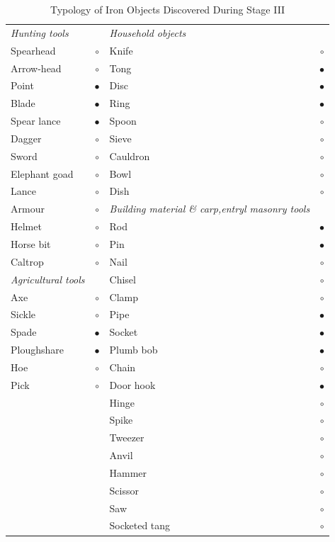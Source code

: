 {\newpage

{\fontsize{8}{10}\selectfont
\begin{longtable}{|l|c|p{3cm}|c|}
\captionsetup{font=footnotesize}
\caption{Typology of Iron Objects Discovered During Stage III}\label{table IV.10}\\
\hline
{\it Hunting tools}  & & {\it Household objects} & \\
Spearhead & $\circ$ & Knife &$\circ$\\
Arrow-head & $\circ$& Tong &$\bullet$\\
Point& $\bullet$ & Disc &$\bullet$\\
Blade & $\bullet$ & Ring & $\bullet$\\
Spear lance & $\bullet$ & Spoon &$\circ$\\
Dagger & $\circ$ & Sieve & $\circ$ \\
Sword & $\circ$ & Cauldron &$\circ$\\
Elephant goad & $\circ$ & Bowl & $\circ$\\
Lance & $\circ$ & Dish & $\circ$\\
Armour & $\circ$ & {\it Building material \& carp,entryl masonry tools} & \\
Helmet & $\circ$ & Rod & $\bullet$\\
Horse bit & $\circ$ & Pin & $\bullet$\\
Caltrop & $\circ$ & Nail & $\circ$\\
{\it Agricultural tools} & &  Chisel & $\circ$\\
Axe & $\circ$ & Clamp & $\circ$ \\
Sickle & $\circ$ & Pipe &$\bullet$\\
Spade & $\bullet$ & Socket & $\bullet$\\
Ploughshare & $\bullet$ & Plumb bob & $\bullet$\\
Hoe & $\circ$ & Chain & $\circ$\\
Pick & $\circ$ & Door hook & $\bullet$\\
&& Hinge & $\circ$\\
&& Spike & $\circ$\\
&& Tweezer & $\circ$\\
&& Anvil & $\circ$\\
&&Hammer & $\circ$\\
&& Scissor & $\circ$\\
&&Saw & $\circ$\\
&& Socketed tang & $\circ$\\
\hline
\end{longtable}
}

}
